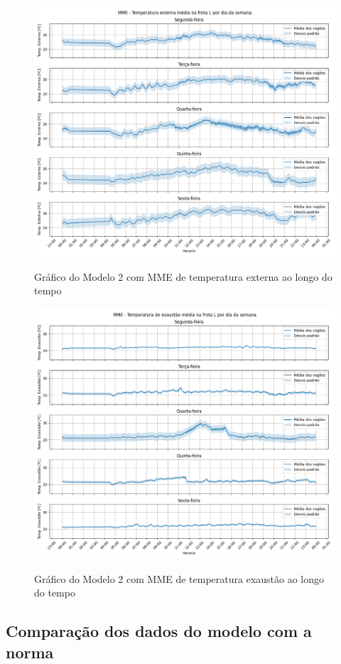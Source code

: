 \documentclass[acronym,symbols,table]{fei}
\begin{document}
\begin{figure}[!htb]
	    \centering
	    \caption{Gráfico do Modelo 2 com MME de temperatura externa ao longo do tempo}
        \includegraphics[width=0.7\linewidth]{Imagens/MME_-_Temperatura_externa_media_na_frota_L_por_dia_da_semana.png}
        \label{fig:temperaturaextmodelo2}
\end{figure}

\begin{figure}[!htb]
	\centering
	\caption{Gráfico do Modelo 2 com MME de temperatura exaustão ao longo do tempo}
    \includegraphics[width=0.7\linewidth]{Imagens/MME_-_Temperatura_de_exaustao_media_na_frota_L_por_dia_da_semana.png}
    \label{fig:temperaturaexaumodelo2}
\end{figure}

\newpage

\subsection{Comparação dos dados do modelo com a norma}
\end{document}
